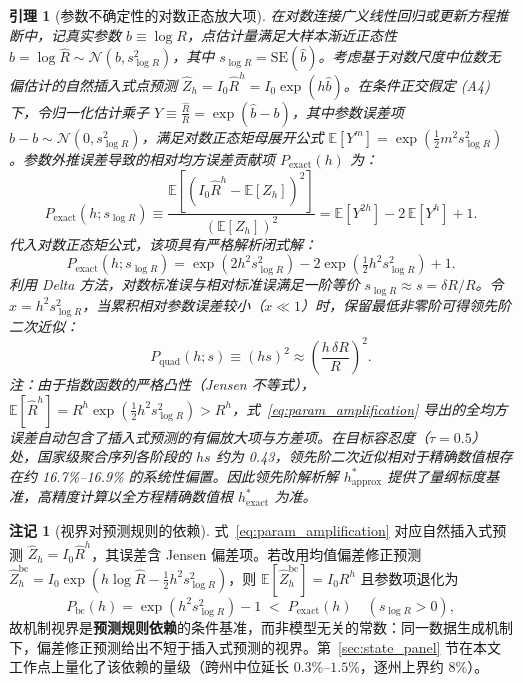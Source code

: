 \documentclass[11pt,a4paper]{article}
\theoremstyle{plain}
\newtheorem{lemma}{引理}
\theoremstyle{definition}
\newtheorem*{remark}{注记}
\begin{document}
\begin{lemma}[参数不确定性的对数正态放大项]\label{lem:param_amplification}
在对数连接广义线性回归或更新方程推断中，记真实参数 $b \equiv \log R$，点估计量满足大样本渐近正态性 $\hat{b} = \log \hat{R} \sim \mathcal{N}(b, s_{\log R}^2)$，其中 $s_{\log R} = \text{SE}(\hat{b})$。考虑基于对数尺度中位数无偏估计的自然插入式点预测 $\hat{Z}_h = I_0 \hat{R}^h = I_0 \exp(h \hat{b})$。在条件正交假定 (A4) 下，令归一化估计乘子 $Y \equiv \frac{\hat{R}}{R} = \exp(\hat{b} - b)$，其中参数误差项 $\hat{b} - b \sim \mathcal{N}(0, s_{\log R}^2)$，满足对数正态矩母展开公式 $\mathbb{E}[Y^m] = \exp(\tfrac{1}{2} m^2 s_{\log R}^2)$。参数外推误差导致的相对均方误差贡献项 $P_{\text{exact}}(h)$ 为：
\begin{equation}
P_{\text{exact}}(h; s_{\log R}) \equiv \frac{\mathbb{E}[(I_0 \hat{R}^h - \mathbb{E}[Z_h])^2]}{(\mathbb{E}[Z_h])^2} = \mathbb{E}\left[Y^{2h}\right] - 2\,\mathbb{E}\left[Y^{h}\right] + 1.
\end{equation}
代入对数正态矩公式，该项具有严格解析闭式解：
\begin{equation}
P_{\text{exact}}(h; s_{\log R}) = \exp\!\left(2 h^2 s_{\log R}^2\right) - 2 \exp\!\left(\tfrac{1}{2} h^2 s_{\log R}^2\right) + 1.
\label{eq:param_amplification}
\end{equation}
利用 Delta 方法，对数标准误与相对标准误满足一阶等价 $s_{\log R} \approx s = \delta R / R$。令 $x = h^2 s_{\log R}^2$，当累积相对参数误差较小（$x \ll 1$）时，保留最低非零阶可得领先阶二次近似：
\begin{equation}
P_{\text{quad}}(h; s) \equiv (h s)^2 \approx \left(\frac{h\,\delta R}{R}\right)^2.
\end{equation}
注：由于指数函数的严格凸性（Jensen 不等式），$\mathbb{E}[\hat{R}^h] = R^h \exp(\tfrac{1}{2}h^2 s_{\log R}^2) > R^h$，式~\eqref{eq:param_amplification} 导出的全均方误差自动包含了插入式预测的有偏放大项与方差项。在目标容忍度（$\tau=0.5$）处，国家级聚合序列各阶段的 $h s$ 约为 0.43，领先阶二次近似相对于精确数值根存在约 16.7\%--16.9\% 的系统性偏置。因此领先阶解析解 $h^*_{\text{approx}}$ 提供了量纲标度基准，高精度计算以全方程精确数值根 $h^*_{\text{exact}}$ 为准。
\end{lemma}


\begin{remark}[视界对预测规则的依赖]\label{rem:predictor}
式~\eqref{eq:param_amplification} 对应自然插入式预测 $\hat{Z}_h = I_0 \hat{R}^h$，其误差含 Jensen 偏差项。若改用均值偏差修正预测 $\hat{Z}_h^{\text{bc}} = I_0 \exp\!\left(h\log\hat{R} - \tfrac{1}{2} h^2 s_{\log R}^2\right)$，则 $\mathbb{E}[\hat{Z}_h^{\text{bc}}] = I_0 R^h$ 且参数项退化为
\begin{equation}
P_{\text{bc}}(h) = \exp\!\left(h^2 s_{\log R}^2\right) - 1 \;<\; P_{\text{exact}}(h) \quad (s_{\log R} > 0),
\label{eq:p_bc}
\end{equation}
故机制视界是\textbf{预测规则依赖}的条件基准，而非模型无关的常数：同一数据生成机制下，偏差修正预测给出不短于插入式预测的视界。第~\ref{sec:state_panel} 节在本文工作点上量化了该依赖的量级（跨州中位延长 $0.3\%$--$1.5\%$，逐州上界约 $8\%$）。
\end{remark}
\end{document}
